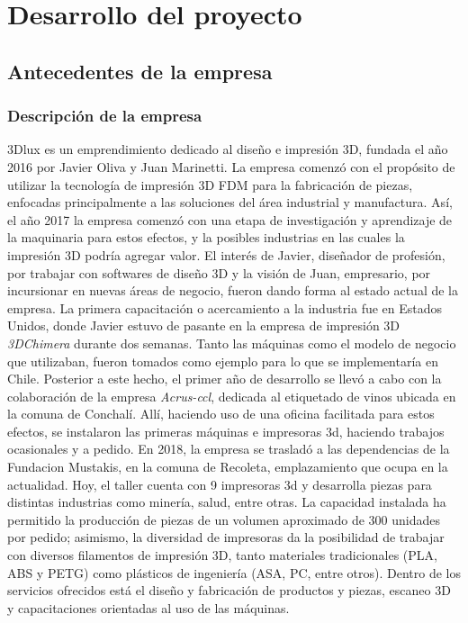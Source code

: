 \chapter{Desarrollo del proyecto}
\label{cap:estadodelarte}


\section{Antecedentes de la empresa}

\subsection{Descripción de la empresa}

3Dlux es un emprendimiento dedicado al diseño e impresión 3D, fundada el año 2016 por Javier Oliva y Juan Marinetti. La empresa comenzó con el propósito de utilizar la tecnología de impresión 3D FDM para la fabricación de piezas, enfocadas principalmente a las soluciones del área industrial y manufactura. Así, el año 2017 la empresa comenzó con una etapa de investigación y aprendizaje de la maquinaria para estos efectos, y la posibles industrias en las cuales la impresión 3D podría agregar valor. El interés de Javier, diseñador de profesión, por trabajar con softwares de diseño 3D y la visión de Juan, empresario, por incursionar en nuevas áreas de negocio, fueron dando forma al estado actual de la empresa. 
La primera capacitación o acercamiento a la industria fue en Estados Unidos, donde Javier estuvo de pasante en la empresa de impresión 3D \textit{3DChimera} durante dos semanas. Tanto las máquinas como el modelo de negocio que utilizaban, fueron tomados como ejemplo para lo que se implementaría en Chile. Posterior a este hecho, el primer año de desarrollo se llevó a cabo con la colaboración de la empresa \textit{Acrus-ccl}, dedicada al etiquetado de vinos ubicada en la comuna de Conchalí. Allí, haciendo uso de una oficina facilitada para estos efectos, se instalaron las primeras máquinas e impresoras 3d, haciendo trabajos ocasionales y a pedido. En 2018, la empresa se trasladó a las dependencias de la Fundacion Mustakis, en la comuna de Recoleta, emplazamiento que ocupa en la actualidad. Hoy, el taller cuenta con 9 impresoras 3d y desarrolla piezas para distintas industrias como minería, salud, entre otras. La capacidad instalada ha permitido la producción de piezas de un volumen aproximado de 300 unidades por pedido; asimismo, la diversidad de impresoras da la posibilidad de trabajar con diversos filamentos de impresión 3D, tanto materiales tradicionales (PLA, ABS y PETG) como plásticos de ingeniería (ASA, PC, entre otros). Dentro de los servicios ofrecidos está el diseño y fabricación de productos y piezas, escaneo 3D y capacitaciones orientadas al uso de las máquinas. 




